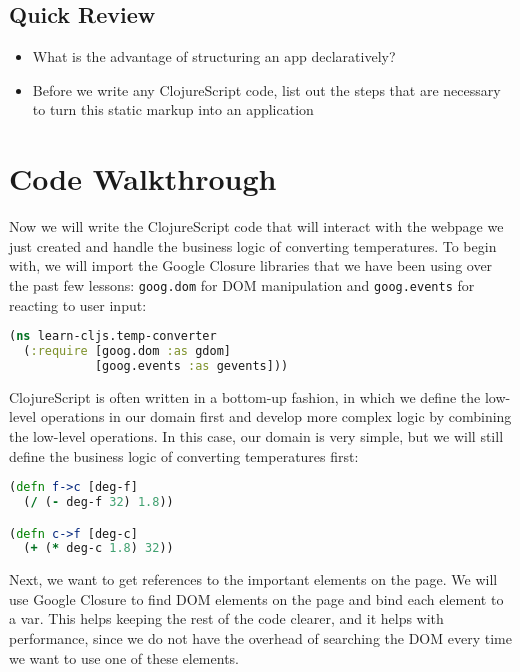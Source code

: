 \documentclass[10pt,twoside,openright]{memoir}
\begin{document}
\subsection{Quick Review}

\begin{itemize}
\tightlist
\item
  What is the advantage of structuring an app declaratively?
\item
  Before we write any ClojureScript code, list out the steps that are
  necessary to turn this static markup into an application
\end{itemize}


\section{Code Walkthrough}

Now we will write the ClojureScript code that will interact with the
webpage we just created and handle the business logic of converting
temperatures. To begin with, we will import the Google Closure libraries
that we have been using over the past few lessons: \texttt{goog.dom} for
DOM manipulation and \texttt{goog.events} for reacting to user input:

\begin{lstlisting}[language=Clojure]
(ns learn-cljs.temp-converter
  (:require [goog.dom :as gdom]
            [goog.events :as gevents]))
\end{lstlisting}

ClojureScript is often written in a bottom-up fashion, in which we
define the low-level operations in our domain first and develop more
complex logic by combining the low-level operations. In this case, our
domain is very simple, but we will still define the business logic of
converting temperatures first:

\begin{lstlisting}[language=Clojure]
(defn f->c [deg-f]
  (/ (- deg-f 32) 1.8))

(defn c->f [deg-c]
  (+ (* deg-c 1.8) 32))
\end{lstlisting}

Next, we want to get references to the important elements on the page.
We will use Google Closure to find DOM elements on the page and bind
each element to a var. This helps keeping the rest of the code clearer,
and it helps with performance, since we do not have the overhead of
searching the DOM every time we want to use one of these elements.
\end{document}
